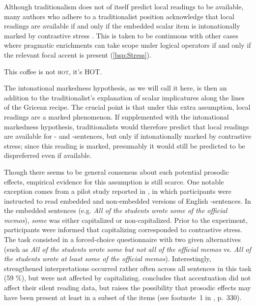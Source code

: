 \documentclass[fleqn,reqno,10pt,draft]{article}
\newcommand{\as}{\acro{as}}
\renewcommand{\es}{\acro{es}}
\begin{document}
Although traditionalism does not of itself predict local readings to
be available, many authors who adhere to a traditionalist position
acknowledge that local readings are available if and only if the
embedded scalar item is intonationally marked by contrastive stress
\citep[e.g.][]{Horn2006:The-Border-Wars,Geurts2009:Scalar-Implicat,Geurts2010:Quantity-Implic,GeurtsTielvan-Tiel2013:Scalar-expressi}. This
is taken to be continuous with other cases where pragmatic enrichments
can take scope under logical operators if and only if the relevant
focal accent is present (\ref{bsp:Stress}).

\begin{exe}
\ex \label{bsp:Stress} This coffee is not \textsc{hot}, it's \textsc{HOT}.
\end{exe}

\noindent The
intonational markedness hypothesis, as we will call it here, is then
an addition to the traditionalist's explanation of scalar implicatures
along the lines of the Gricean recipe. The crucial point is that under
this extra assumption, local readings are a marked phenomenon. If
supplemented with the intonational markedness hypothesis,
traditionalists would therefore predict that local readings are
available for \as- and \es-sentences, but only if intonationally
marked by contrastive stress; since this reading is marked, presumably
it would still be predicted to be dispreferred even if available.

Though there seems to be general consensus about such potential
prosodic effects, empirical evidence for this assumption is still
scarce. One notable exception comes from a pilot study reported in
\citet{Frazier08}, in which participants were instructed to read
embedded and non-embedded versions of English \as-sentences. In the
embedded sentences (e.g. {\it All of the students wrote some of the
  official memos}), {\it some} was either capitalized or
non-capitalized. Prior to the experiment, participants were informed
that capitalizing corresponded to contrastive stress. The task
consisted in a forced-choice questionnaire with two given alternatives
(such as {\it All of the students wrote some but not all of the
  official memos} vs. {\it All of the students wrote at least some of
  the official memos}). Interestingly, strengthened interpretations
occurred rather often across all sentences in this task (59 \%), but
were not affected by capitalizing.
\citeauthor{Frazier08} concludes that accentuation did not affect
their silent reading data, but raises the possibility that prosodic
effects may have been present at least in a subset of the items (see
footnote~1 in \citet{Frazier08}, p.~330).
\end{document}
